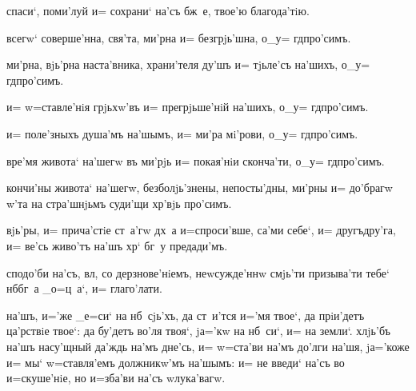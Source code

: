   спаси`, поми'луй и= сохрани` на'съ 
бж~е, твое'ю благода'тiю.


 всегw` соверше'нна, свя'та, ми'рна и= 
безгрjь'шна, о_у= гд про'симъ.


 ми'рна, вjь'рна наста'вника, храни'теля ду'шъ 
и= тjьле'съ на'шихъ, о_у= гд про'симъ.


 и= w=ставле'нiя грjьхw'въ и= прегрjьше'нiй 
на'шихъ, о_у= гд про'симъ.


 и= поле'зныхъ душа'мъ на'шымъ, и= ми'ра 
мi'рови, о_у= гд про'симъ.


 вре'мя живота` на'шегw въ ми'рjь и= покая'нiи 
сконча'ти, о_у= гд про'симъ.


 кончи'ны живота` на'шегw, 
безболjь'знены, непосты'дны, ми'рны и= до'брагw w'та 
на стра'шнjьмъ суди'щи хр'вjь про'симъ.


 вjь'ры, и= прича'стiе ст~а'гw дх~а 
и=спроси'вше, са'ми себе`, и= другъдру'га, и= ве'сь 
живо'тъ на'шъ хр` бг~у предади'мъ.



 сподо'би на'съ, вл, со дерзнове'нiемъ, 
неwсужде'ннw смjь'ти призыва'ти тебе` нб бг~а 
_о=ц~а`, и= глаго'лати.


 на'шъ, и='же _е=си` на нб~сjь'хъ, да 
ст~и'тся и='мя твое`, да прiи'детъ ца'рствiе твое`: да 
бу'детъ во'ля твоя`, jа='кw на нб~си`, и= на земли`. 
хлjь'бъ на'шъ насу'щный да'ждь на'мъ дне'сь, и= w=ста'ви 
на'мъ до'лги на'шя, jа='коже и= мы` w=ставля'емъ 
должникw'мъ на'шымъ: и= не введи` на'съ во и=скуше'нiе, 
но и=зба'ви на'съ w\т лука'вагw.

